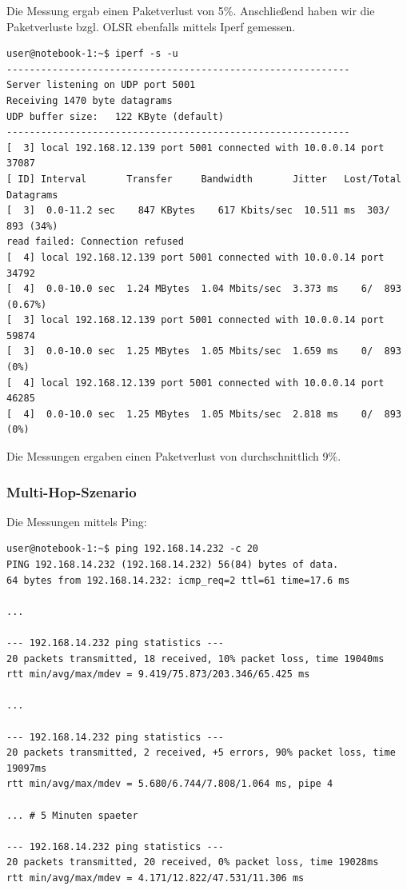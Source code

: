 \documentclass[a4paper,10pt]{article}
\begin{document}
Die Messung ergab einen Paketverlust von 5\%.
Anschließend haben wir die Paketverluste bzgl. OLSR ebenfalls mittels Iperf gemessen.

\begin{lstlisting}
user@notebook-1:~$ iperf -s -u
------------------------------------------------------------
Server listening on UDP port 5001
Receiving 1470 byte datagrams
UDP buffer size:   122 KByte (default)
------------------------------------------------------------
[  3] local 192.168.12.139 port 5001 connected with 10.0.0.14 port 37087
[ ID] Interval       Transfer     Bandwidth       Jitter   Lost/Total Datagrams
[  3]  0.0-11.2 sec    847 KBytes    617 Kbits/sec  10.511 ms  303/  893 (34%)
read failed: Connection refused
[  4] local 192.168.12.139 port 5001 connected with 10.0.0.14 port 34792
[  4]  0.0-10.0 sec  1.24 MBytes  1.04 Mbits/sec  3.373 ms    6/  893 (0.67%)
[  3] local 192.168.12.139 port 5001 connected with 10.0.0.14 port 59874
[  3]  0.0-10.0 sec  1.25 MBytes  1.05 Mbits/sec  1.659 ms    0/  893 (0%)
[  4] local 192.168.12.139 port 5001 connected with 10.0.0.14 port 46285
[  4]  0.0-10.0 sec  1.25 MBytes  1.05 Mbits/sec  2.818 ms    0/  893 (0%)
\end{lstlisting}

Die Messungen ergaben einen Paketverlust von durchschnittlich 9\%. 

\subsubsection*{Multi-Hop-Szenario}

Die Messungen mittels Ping:

\begin{lstlisting}
user@notebook-1:~$ ping 192.168.14.232 -c 20
PING 192.168.14.232 (192.168.14.232) 56(84) bytes of data.
64 bytes from 192.168.14.232: icmp_req=2 ttl=61 time=17.6 ms

...

--- 192.168.14.232 ping statistics --- 
20 packets transmitted, 18 received, 10% packet loss, time 19040ms
rtt min/avg/max/mdev = 9.419/75.873/203.346/65.425 ms

...

--- 192.168.14.232 ping statistics ---
20 packets transmitted, 2 received, +5 errors, 90% packet loss, time 19097ms
rtt min/avg/max/mdev = 5.680/6.744/7.808/1.064 ms, pipe 4

... # 5 Minuten spaeter

--- 192.168.14.232 ping statistics ---
20 packets transmitted, 20 received, 0% packet loss, time 19028ms
rtt min/avg/max/mdev = 4.171/12.822/47.531/11.306 ms
\end{lstlisting}
\end{document}
